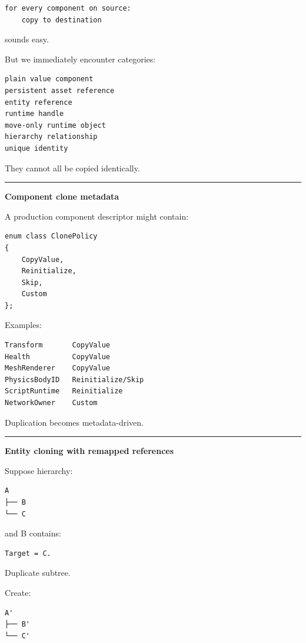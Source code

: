 \begin{verbatim}
for every component on source:
    copy to destination
\end{verbatim}

sounds easy.

But we immediately encounter categories:

\begin{verbatim}
plain value component
persistent asset reference
entity reference
runtime handle
move-only runtime object
hierarchy relationship
unique identity
\end{verbatim}

They cannot all be copied identically.

\begin{center}\rule{0.5\linewidth}{0.5pt}\end{center}

\textbf{Component clone metadata}

A production component descriptor might contain:

\begin{verbatim}
enum class ClonePolicy
{
    CopyValue,
    Reinitialize,
    Skip,
    Custom
};
\end{verbatim}

Examples:

\begin{verbatim}
Transform       CopyValue
Health          CopyValue
MeshRenderer    CopyValue
PhysicsBodyID   Reinitialize/Skip
ScriptRuntime   Reinitialize
NetworkOwner    Custom
\end{verbatim}

Duplication becomes metadata-driven.

\begin{center}\rule{0.5\linewidth}{0.5pt}\end{center}

\textbf{Entity cloning with remapped references}

Suppose hierarchy:

\begin{verbatim}
A
├── B
└── C
\end{verbatim}

and B contains:

\begin{verbatim}
Target = C.
\end{verbatim}

Duplicate subtree.

Create:

\begin{verbatim}
A'
├── B'
└── C'
\end{verbatim}

